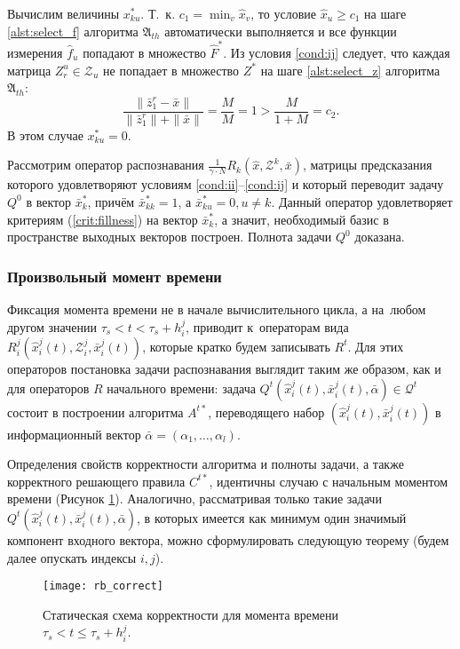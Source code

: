 \begin{Proof}
 Вычислим величины $x_{ku}^*$. Т.~к. $c_1=\min_v\hat x_v$, то условие $\hat x_u\geqslant c_1$ на шаге \ref{alst:select_f} алгоритма $\mathfrak{A}_{th}$ автоматически выполняется и все функции измерения $\hat f_u$ попадают в множество $\hat F^*$. Из условия \ref{cond:ij} следует, что каждая матрица $Z_r^u\in\mathcal Z_u$ не попадает в множество $Z^*$ на шаге \ref{alst:select_z} алгоритма $\mathfrak A_{th}$:
 \begin{equation}
 	\frac{\|\bar{z}_1^r-\bar{x}\|}{\|\bar{z}_1^r\|+\|\bar{x}\|}=\frac{M}{M}=1>\frac{M}{1+M}=c_2.
 \end{equation}
 В этом случае $x_{ku}^*=0$.
 
 Рассмотрим оператор распознавания $\frac{1}{\gamma\cdot N}R_k(\hat x,\mathcal Z^k,\bar x)$, матрицы предсказания которого удовлетворяют условиям \ref{cond:ii}--\ref{cond:ij} и который переводит задачу $Q^0$ в вектор $\bar x_k^*$, причём $\bar x_{kk}^*=1$, а $\bar x_{ku}^*=0, u\neq k$. Данный оператор удовлетворяет критериям (\ref{crit:fillness}) на вектор $\bar x_k^*$, а значит, необходимый базис в пространстве выходных векторов построен. Полнота задачи $Q^0$ доказана.
\end{Proof}

\subsubsection{Произвольный момент времени}
Фиксация момента времени не в начале вычислительного цикла, а на~любом другом значении $\tau_s<t<\tau_s+h_i^j$, приводит к~операторам вида $R_i^j(\hat{x}_i^j(t), \mathcal{Z}_i^j, \bar{x}_i^j(t))$, которые кратко будем записывать $R^t$. Для этих операторов постановка задачи распознавания выглядит таким же образом, как и для операторов $R$ начального времени: задача $Q^t(\hat{x}_i^j(t), \bar{x}_i^j(t), \bar\alpha)\in\mathcal Q^t$ состоит в построении алгоритма $A^{t*}$, переводящего набор $(\hat{x}_i^j(t), \bar{x}_i^j(t))$ в информационный вектор $\bar\alpha=(\alpha_1,\dots,\alpha_l)$. 

Определения свойств корректности алгоритма и полноты задачи, а также корректного решающего правила $C^{t*}$, идентичны случаю с начальным моментом времени (Рисунок \ref{fig:rb_correct_statt}). Аналогично, рассматривая только такие задачи $Q^t(\hat{x}_i^j(t), \bar{x}_i^j(t), \bar\alpha)$, в которых имеется как минимум один значимый компонент входного вектора, можно сформулировать следующую теорему (будем далее опускать индексы $i,j$).
	
\begin{figure}[h]
	\centering
	\texttt{[image: rb\_correct]}
	\caption{Статическая схема корректности для момента времени $\tau_s<t\leqslant\tau_s+h_i^j$.}
	\label{fig:rb_correct_statt}
\end{figure}
	
